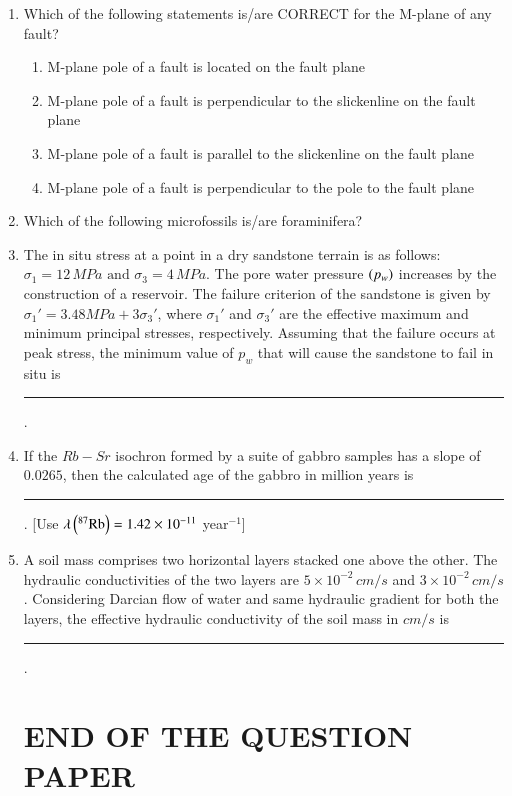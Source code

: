 \documentclass[journal,12pt,onecolumn]{IEEEtran}
\theoremstyle{remark}
\begin{document}
\begin{enumerate}
\item Which of the following statements is/are CORRECT for the M-plane of any fault?
\begin{enumerate}
    \item M-plane pole of a fault is located on the fault plane
    \item M-plane pole of a fault is perpendicular to the slickenline on the fault plane
    \item M-plane pole of a fault is parallel to the slickenline on the fault plane
    \item M-plane pole of a fault is perpendicular to the pole to the fault plane
\end{enumerate}
\hfill{}

\item Which of the following microfossils is/are foraminifera?
\begin{enumerate}
\end{enumerate}
\hfill{}

\item The in situ stress at a point in a dry sandstone terrain is as follows: $\sigma_1 = 12\,MPa \text{ and } \sigma_3 = 4\,MPa$. The pore water pressure $\left(p_w\right)$ increases by the construction of a reservoir. The failure criterion of the sandstone is given by $\sigma_1' = 3.48 MPa + 3\sigma_3'$, where $\sigma_1'$ and $\sigma_3'$ are the effective maximum and minimum principal stresses, respectively. Assuming that the failure occurs at peak stress, the minimum value of $p_w$  that will cause the sandstone to fail in situ is \rule{3cm}{0.15mm} .
\hfill{}

\item If the $Rb-Sr$ isochron formed by a suite of gabbro samples has a slope of $0.0265$, then the calculated age of the gabbro in million years is \rule{3cm}{0.15mm} . [Use $\lambda\left(^{87}\text{Rb}\right) = 1.42 \times 10^{-11}$ year$^{-1}$]
\hfill{}

\item A soil mass comprises two horizontal layers  stacked one above the other. The hydraulic conductivities of the two layers are $5 \times 10^{-2}\,cm/s$ and $3 \times 10^{-2}\,cm/s$. Considering Darcian flow of water and same hydraulic gradient for both the layers, the effective hydraulic conductivity of the soil mass in $cm/s$ is \rule{3cm}{0.15mm} .
\hfill{}

\centering\section*{END OF THE QUESTION PAPER}

\end{enumerate}
\end{document}
